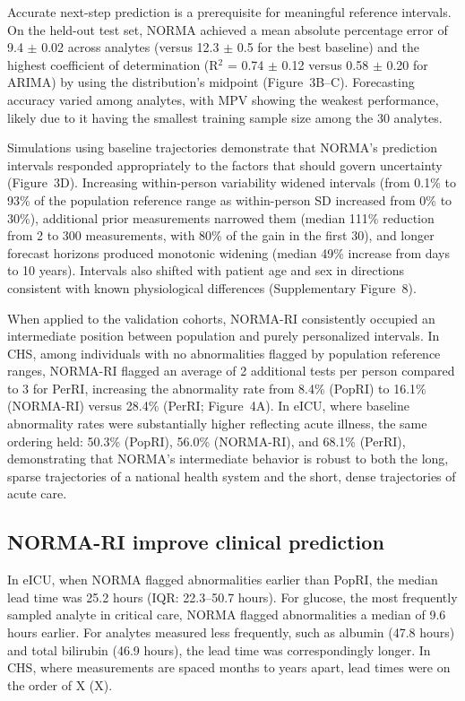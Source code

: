 \documentclass[11pt]{article}
\begin{document}
Accurate next-step prediction is a prerequisite for meaningful reference intervals. On the held-out test set, NORMA achieved a mean absolute percentage error of 9.4 $\pm$ 0.02 across analytes (versus 12.3 $\pm$ 0.5 for the best baseline) and the highest coefficient of determination (R$^2$ = 0.74 $\pm$ 0.12 versus 0.58 $\pm$ 0.20 for ARIMA) by using the distribution's midpoint (Figure~3B--C). Forecasting accuracy varied among analytes, with MPV showing the weakest performance, likely due to it having the smallest training sample size among the 30 analytes.

Simulations using baseline trajectories demonstrate that NORMA's prediction intervals responded appropriately to the factors that should govern uncertainty (Figure~3D). Increasing within-person variability widened intervals (from 0.1\% to 93\% of the population reference range as within-person SD increased from 0\% to 30\%), additional prior measurements narrowed them (median 111\% reduction from 2 to 300 measurements, with 80\% of the gain in the first 30), and longer forecast horizons produced monotonic widening (median 49\% increase from days to 10 years). Intervals also shifted with patient age and sex in directions consistent with known physiological differences (Supplementary Figure~8).

When applied to the validation cohorts, NORMA-RI consistently occupied an intermediate position between population and purely personalized intervals. In CHS, among individuals with no abnormalities flagged by population reference ranges, NORMA-RI flagged an average of 2 additional tests per person compared to 3 for PerRI, increasing the abnormality rate from 8.4\% (PopRI) to 16.1\% (NORMA-RI) versus 28.4\% (PerRI; Figure~4A). In eICU, where baseline abnormality rates were substantially higher reflecting acute illness, the same ordering held: 50.3\% (PopRI), 56.0\% (NORMA-RI), and 68.1\% (PerRI), demonstrating that NORMA's intermediate behavior is robust to both the long, sparse trajectories of a national health system and the short, dense trajectories of acute care.

\subsection*{NORMA-RI improve clinical prediction}

In eICU, when NORMA flagged abnormalities earlier than PopRI, the median lead time was 25.2 hours (IQR: 22.3--50.7 hours). For glucose, the most frequently sampled analyte in critical care, NORMA flagged abnormalities a median of 9.6 hours earlier. For analytes measured less frequently, such as albumin (47.8 hours) and total bilirubin (46.9 hours), the lead time was correspondingly longer. In CHS, where measurements are spaced months to years apart, lead times were on the order of X (X).
\end{document}
